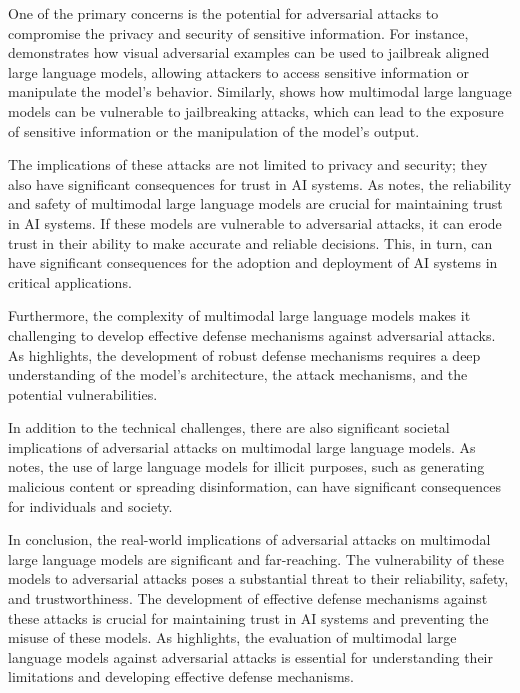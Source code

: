 \documentclass[11pt,a4paper]{article}
\begin{document}
One of the primary concerns is the potential for adversarial attacks to compromise the privacy and security of sensitive information. For instance, \cite{doi:10.1609/aaai.v38i19.30150} demonstrates how visual adversarial examples can be used to jailbreak aligned large language models, allowing attackers to access sensitive information or manipulate the model's behavior. Similarly, \cite{arxiv:2402.02309} shows how multimodal large language models can be vulnerable to jailbreaking attacks, which can lead to the exposure of sensitive information or the manipulation of the model's output.

The implications of these attacks are not limited to privacy and security; they also have significant consequences for trust in AI systems. As \cite{arxiv:2409.18991} notes, the reliability and safety of multimodal large language models are crucial for maintaining trust in AI systems. If these models are vulnerable to adversarial attacks, it can erode trust in their ability to make accurate and reliable decisions. This, in turn, can have significant consequences for the adoption and deployment of AI systems in critical applications.

Furthermore, the complexity of multimodal large language models makes it challenging to develop effective defense mechanisms against adversarial attacks. As \cite{arxiv:2502.01576} highlights, the development of robust defense mechanisms requires a deep understanding of the model's architecture, the attack mechanisms, and the potential vulnerabilities. 

In addition to the technical challenges, there are also significant societal implications of adversarial attacks on multimodal large language models. As \cite{arxiv:2308.12833} notes, the use of large language models for illicit purposes, such as generating malicious content or spreading disinformation, can have significant consequences for individuals and society. 

In conclusion, the real-world implications of adversarial attacks on multimodal large language models are significant and far-reaching. The vulnerability of these models to adversarial attacks poses a substantial threat to their reliability, safety, and trustworthiness. The development of effective defense mechanisms against these attacks is crucial for maintaining trust in AI systems and preventing the misuse of these models. As \cite{arxiv:2408.08632} highlights, the evaluation of multimodal large language models against adversarial attacks is essential for understanding their limitations and developing effective defense mechanisms.
\end{document}
